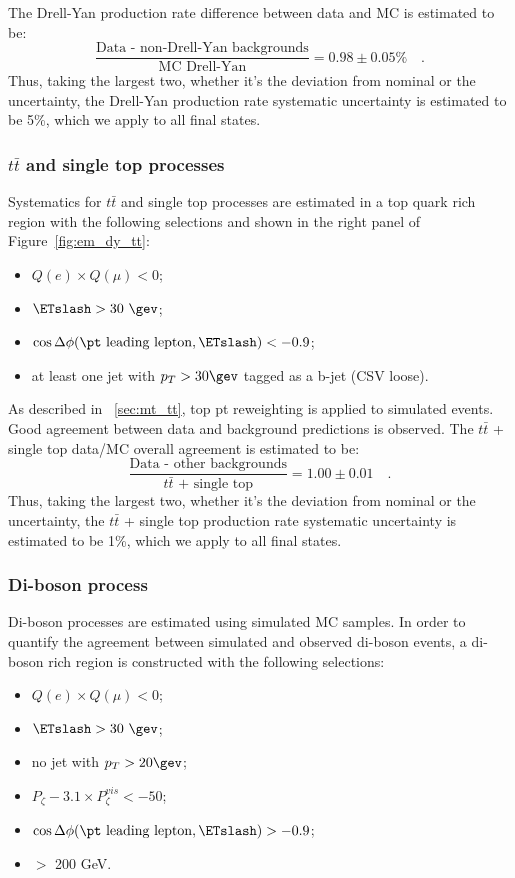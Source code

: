 The Drell-Yan production rate difference between data and MC is estimated to
be:
\begin{equation}\label{eq:DY}
\frac{\text{Data - non-Drell-Yan backgrounds}}{\text{MC Drell-Yan}} = 0.98 \pm 0.05\%\quad.
\end{equation}
Thus, taking the largest two, whether it's the deviation from nominal or the 
uncertainty, the Drell-Yan production rate systematic uncertainty is estimated 
to be 5\%, which we apply to all final states.

\subsubsection{$t\bar{t}$ and single top processes}\label{sec:em_tt}
Systematics for $t\bar{t}$ and single top processes are estimated in a
top quark rich region with the following selections and shown in the
right panel of Figure~\ref{fig:em_dy_tt}:
\begin{itemize}
  \item $Q(e) \times Q(\mu) < 0$;
  \item $\ETslash>30~\gev$;
  \item $\cos{\Delta \phi (\pt\text{ leading lepton},\ETslash)}<-0.9$;
  \item at least one jet with $p_T > 30\gev$ tagged as a b-jet (CSV loose).
\end{itemize}
As described in ~\ref{sec:mt_tt}, top pt reweighting is applied to simulated 
\ttbar events. Good agreement between data and background predictions is 
observed.
The $t\bar{t}$ + single top data/MC overall agreement is estimated to be:
\begin{equation}\label{eq:em_tt}
\frac{\text{Data - other backgrounds}}{\text{$t\bar{t}$ + single top}} = 1.00 \pm 0.01 \quad.
\end{equation}
Thus, taking the largest two, whether it's the deviation from nominal or the 
uncertainty, the $t\bar{t}$ + single top production rate systematic uncertainty 
is estimated to be 1\%, which we apply to all final states.

\subsubsection{Di-boson process}\label{section:diBoson}
Di-boson processes are estimated using simulated MC samples. In order to 
quantify the agreement between simulated and observed di-boson events, a 
di-boson rich region is constructed with the following selections: 
\begin{itemize}\label{table:diboson}
  \item $Q(e) \times Q(\mu) < 0$;
  \item $\ETslash>30~\gev$;
  \item no jet with $p_T > 20\gev$;
  \item $P_{\zeta}- 3.1 \times P_{\zeta}^{vis} < -50$;
  \item $\cos{\Delta \phi (\pt\text{ leading lepton},\ETslash)} > -0.9$;
  \item \meffemu $>$ 200 GeV.
\end{itemize}

